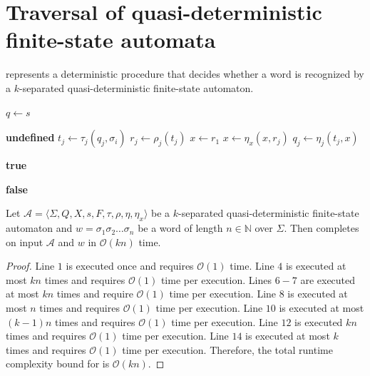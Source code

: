 \section{Traversal of quasi-deterministic finite-state automata}

 represents a deterministic procedure that decides whether
a word is recognized by a $k$-separated quasi-deterministic finite-state automaton.

\begin{algorithm}[h]
  \DontPrintSemicolon

  $q \gets s$\;

   {
     {
       {
        \Return \textbf{undefined}
      }
      $t_j \gets \tau_j(q_j, \sigma_i)$\;
      $r_j \gets \rho_j(t_j)$\;
    }
    $x \gets r_1$\;
     {
      $x \gets \eta_x(x, r_j)$\;
    }
     {
      $q_j \gets \eta_j(t_j, x)$\;
    }
  }

   {
     {
      \Return \textbf{true}
    }
  }

  \Return \textbf{false}

  \caption{Traversal of a $k$-separated quasi-deterministic finite-state automaton.}
  \label{alg:qdfsa_traversal}
\end{algorithm}

\begin{proposition}
  Let $\mathcal{A} = \langle \Sigma, Q, X, s, F, \tau, \rho, \eta, \eta_x
    \rangle$ be a $k$-separated quasi-deterministic finite-state automaton and $w
    = \sigma_1 \sigma_2 \ldots \sigma_n$ be a word of length $n \in \mathbb{N}$
  over $\Sigma$. Then  completes on input
  $\mathcal{A}$ and $w$ in $\mathcal{O}(kn)$ time.
\end{proposition}

\begin{proof}
  Line $1$ is executed once and requires $\mathcal{O}(1)$ time.
  Line $4$ is executed at most $kn$ times and requires $\mathcal{O}(1)$ time
  per execution.
  Lines $6-7$ are executed at most $kn$ times and require $\mathcal{O}(1)$
  time per execution.
  Line $8$ is executed at most $n$ times and requires $\mathcal{O}(1)$ time per
  execution.
  Line $10$ is executed at most $(k-1)n$ times and requires $\mathcal{O}(1)$
  time per execution.
  Line $12$ is executed $kn$ times and requires $\mathcal{O}(1)$ time per
  execution.
  Line $14$ is executed at most $k$ times and requires $\mathcal{O}(1)$ time
  per execution.
  Therefore, the total runtime complexity bound for 
  is $\mathcal{O}(kn)$.
\end{proof}
